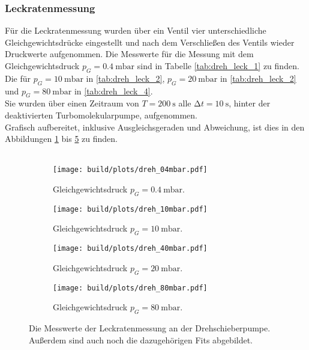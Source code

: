         \subsubsection{Leckratenmessung}

        \noindent Für die Leckratenmessung wurden über ein Ventil vier unterschiedliche Gleichgewichtsdrücke eingestellt
        und nach dem Verschließen des Ventils wieder Druckwerte aufgenommen.
        Die Messwerte für die Messung mit dem Gleichgewichtsdruck $p_G = \SI{0.4}{\milli\bar}$ sind in Tabelle \ref{tab:dreh_leck_1} zu finden.\\
        Die für $p_G = \SI{10}{\milli\bar}$ in \ref{tab:dreh_leck_2}, $p_G = \SI{20}{\milli\bar}$ in \ref{tab:dreh_leck_2} und $p_G = \SI{80}{\milli\bar}$ in \ref{tab:dreh_leck_4}.\\
        Sie wurden über einen Zeitraum von $ T = \SI{200}{\second}$ alle $ \increment t = \SI{10}{\second}$, hinter der deaktivierten Turbomolekularpumpe, aufgenommen.\\
        Grafisch aufbereitet, inklusive Ausgleichsgeraden und Abweichung, ist dies in den Abbildungen \ref{img:dreh_leck_1} bis \ref{img:dreh_leck_4} zu finden.\\\\
        \begin{figure}[H]
            \begin{subfigure}{0.46\textwidth}
                    \centering
                    \texttt{[image: build/plots/dreh\_04mbar.pdf]}
                    \label{img:dreh_leck_1}
                    \caption{Gleichgewichtsdruck $p_G = \SI{0.4}{\milli\bar}$.}
            \end{subfigure}
            \hfill
            \begin{subfigure}{0.46\textwidth}
                    \centering
                    \texttt{[image: build/plots/dreh\_10mbar.pdf]}
                    \label{img:dreh_leck_2}
                    \caption{Gleichgewichtsdruck $p_G = \SI{10}{\milli\bar}$.}
            \end{subfigure}
            \hfill
            \begin{subfigure}{0.46\textwidth}
              \centering
              \texttt{[image: build/plots/dreh\_40mbar.pdf]}
              \label{img:dreh_leck_3}
              \caption{Gleichgewichtsdruck $p_G = \SI{20}{\milli\bar}$.}
            \end{subfigure}
            \hfill
            \begin{subfigure}{0.46\textwidth}
              \centering
              \texttt{[image: build/plots/dreh\_80mbar.pdf]}
              \label{img:dreh_leck_4}
              \caption{Gleichgewichtsdruck $p_G = \SI{80}{\milli\bar}$.}
            \end{subfigure}
            \caption{Die Messwerte der Leckratenmessung an der Drehschieberpumpe.\\
            Außerdem sind auch noch die dazugehörigen Fits abgebildet. }
        \end{figure}

